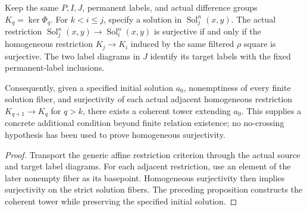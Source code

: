 \begin{proposition}
  \label{prop:synthetic-ess-coherent-tower-of-differences}
  \leanok
  Keep the same $P,I,J$, permanent labels, and actual difference groups
  $K_q=\ker\Phi_q$.  For $k<i\le j$, specify a solution in
  $\operatorname{Sol}_j^n(x,y)$.  The actual restriction
  $\operatorname{Sol}_j^n(x,y)\to\operatorname{Sol}_i^n(x,y)$ is
  surjective if and only if the homogeneous restriction $K_j\to K_i$
  induced by the same filtered $\rho$ square is surjective.  The two
  label diagrams in $J$ identify its target labels with the fixed
  permanent-label inclusions.

  Consequently, given a specified initial solution $a_0$, nonemptiness
  of every finite solution fiber, and surjectivity of each actual adjacent
  homogeneous restriction $K_{q+1}\to K_q$ for $q>k$, there exists a
  coherent tower extending $a_0$.  This supplies a concrete additional
  condition beyond finite relation existence; no no-crossing hypothesis
  has been used to prove homogeneous surjectivity.
\end{proposition}
\begin{proof}
  \leanok
  Transport the generic affine restriction criterion through the actual
  source and target label diagrams.  For each adjacent restriction, use
  an element of the later nonempty fiber as its basepoint.  Homogeneous
  surjectivity then implies surjectivity on the strict solution fibers.
  The preceding proposition constructs the coherent tower while preserving
  the specified initial solution.
\end{proof}


